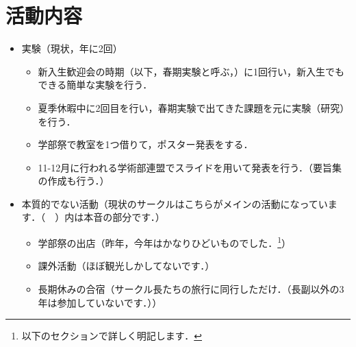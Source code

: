 \documentclass[a4paper,11pt]{ltjsarticle}
\begin{document}
\section{活動内容}

\begin{itemize}
    \item 実験（現状，年に2回）
    \begin{itemize}
        \item 新入生歓迎会の時期（以下，春期実験と呼ぶ，）に1回行い，新入生でもできる簡単な実験を行う．
        \item 夏季休暇中に2回目を行い，春期実験で出てきた課題を元に実験（研究）を行う．
        \item 学部祭で教室を1つ借りて，ポスター発表をする．
        \item 11-12月に行われる学術部連盟でスライドを用いて発表を行う．（要旨集の作成も行う．）
    \end{itemize}
    \item 本質的でない活動（現状のサークルはこちらがメインの活動になっています．（　）内は本音の部分です．）
    \begin{itemize}
        \item 学部祭の出店（昨年，今年はかなりひどいものでした．\footnote{以下のセクションで詳しく明記します．}）
        \item 課外活動（ほぼ観光しかしてないです．）
        \item 長期休みの合宿（サークル長たちの旅行に同行しただけ．（長副以外の3年は参加していないです．））
    \end{itemize}
\end{itemize}
\end{document}
